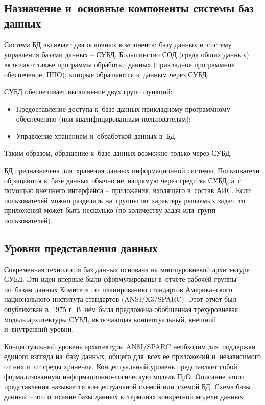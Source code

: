 \documentclass{ou}
\begin{document}
\subsection{Назначение и~основные компоненты системы баз данных}
Система БД включает два основных компонента: базу данных и~систему управления базами данных -- СУБД. Большинство СОД (среда общих данных) включают также программы обработки данных (прикладное программное обеспечение, ППО), которые обращаются к~данным через СУБД.

СУБД обеспечивает выполнение двух групп функций:
\begin{itemize}[label=-, itemindent=4em, nosep]
\item Предоставление доступа к~базе данных прикладному программному обеспечению (или квалифицированным пользователям);
\item Управление хранением и~обработкой данных в~БД.
\end{itemize}

Таким образом, обращение к~базе данных возможно только через СУБД.

БД предназначена для~хранения данных информационной системы. Пользователи обращаются к~базе данных обычно не~напрямую через средства СУБД, а~с помощью внешнего интерфейса -- приложения, входящего в~состав АИС. Если пользователей можно разделить на~группы по~характеру решаемых задач, то приложений может быть несколько (по количеству задач или~групп пользователей). 

\subsection{Уровни представления данных}
Современная технология баз данных основана на многоуровневой архитектуре СУБД. Эти идеи впервые были сформулированы в~отчёте рабочей группы по~базам данных Комитета по~планированию стандартов Американского национального института стандартов (ANSI/X3/SPARC). Этот отчёт был опубликован в~1975 г. В~нём была предложена обобщенная трёхуровневая модель архитектуры СУБД, включающая концептуальный, внешний и~внутренний уровни.

Концептуальный уровень архитектуры ANSI/SPARC необходим для~поддержки единого взгляда на~базу данных, общего для~всех её приложений и~независимого от них и~от среды хранения. Концептуальный уровень представляет собой формализованную информационно-логическую модель ПрО. Описание этого представления называется концептуальной схемой или~схемой БД. Схема базы данных -- это описание базы данных в~терминах конкретной модели данных.
\end{document}
